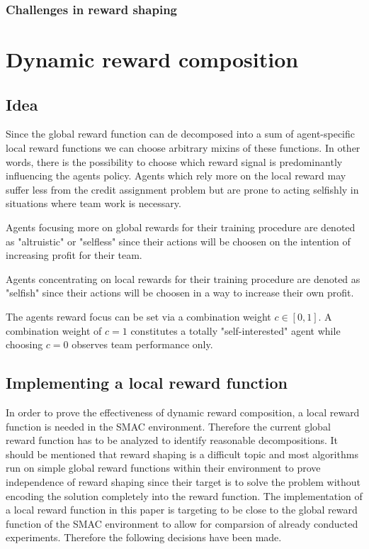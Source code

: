 \subsection{Challenges in reward shaping}

\chapter{Dynamic reward composition}
\section{Idea}

Since the global reward function can de decomposed into a sum of agent-specific local reward functions we can choose arbitrary mixins of these functions. In other words, there is the possibility to choose which reward signal is predominantly influencing the agents policy. Agents which rely more on the local reward may suffer less from the credit assignment problem but are prone to acting selfishly in situations where team work is necessary.

Agents focusing more on global rewards for their training procedure are denoted as "altruistic" or "selfless" since their actions will be choosen on the intention of increasing profit for their team.

Agents concentrating on local rewards for their training procedure are denoted as "selfish" since their actions will be choosen in a way to increase their own profit.

The agents reward focus can be set via a combination weight $c \in [0,1]$. A combination weight of $c=1$ constitutes a totally "self-interested" agent while choosing $c=0$ observes team performance only.
\section{Implementing a local reward function}

In order to prove the effectiveness of dynamic reward composition, a local reward function is needed in the SMAC environment. Therefore the current global reward function has to be analyzed to identify reasonable decompositions. It should be mentioned that reward shaping is a difficult topic and most algorithms run on simple global reward functions within their environment to prove independence of reward shaping since their target is to solve the problem without encoding the solution completely into the reward function. The implementation of a local reward function in this paper is targeting to be close to the global reward function of the SMAC environment to allow for comparsion of already conducted experiments. Therefore the following decisions have been made.
 
